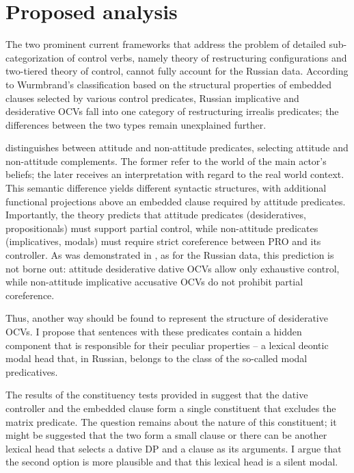 \documentclass[output=paper,
colorlinks,
citecolor=brown,
newtxmath
]{langscibook}
\begin{document}
\section{Proposed analysis}\label{s3}

The two prominent current frameworks that address the problem of detailed sub-categorization of control verbs, namely  theory of restructuring configurations and  two-tiered theory of control, cannot fully account for the Russian data. According to Wurmbrand’s classification based on the structural properties of embedded clauses selected by various control predicates, Russian implicative and desiderative OCVs fall into one category of restructuring irrealis predicates; the differences between the two types remain unexplained further. \par

\cite{Landau2015} distinguishes between attitude and non-attitude predicates, selecting attitude and non-attitude complements. The former refer to the world of the main actor’s beliefs; the later receives an interpretation with regard to the real world context. This semantic difference yields different syntactic structures, with additional functional projections above an embedded clause required by attitude predicates. Importantly, the theory predicts that attitude predicates (desideratives, propositionals) must support partial control, while non-attitude predicates (implicatives, modals) must require strict coreference between PRO and its controller. As was demonstrated in , as for the Russian data, this prediction is not borne out: attitude desiderative dative OCVs allow only exhaustive control, while non-attitude implicative accusative OCVs do not prohibit partial coreference. \par

Thus, another way should be found to represent the structure of desiderative OCVs. I propose that sentences with these predicates contain a hidden component that is responsible for their peculiar properties – a lexical deontic modal head that, in Russian, belongs to the class of the so-called modal predicatives. \par

The results of the constituency tests provided in  suggest that the dative controller and the embedded clause form a single constituent that excludes the matrix predicate. The question remains about the nature of this constituent; it might be suggested that the two form a small clause or there can be another lexical head that selects a dative DP and a clause as its arguments. I argue that the second option is more plausible and that this lexical head is a silent modal. \par
\end{document}
